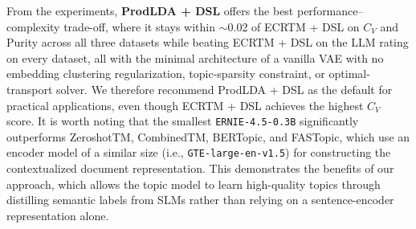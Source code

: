 \documentclass{article}
\theoremstyle{plain}
\theoremstyle{definition}
\theoremstyle{remark}
\begin{document}
From the experiments, \textbf{ProdLDA + DSL} offers the best
performance--complexity trade-off, where it stays within $\sim$0.02 of
ECRTM + DSL on $C_V$ and Purity across all three datasets while
beating ECRTM + DSL on the LLM rating on every dataset, all with the
minimal architecture of a vanilla VAE with no embedding clustering
regularization, topic-sparsity constraint, or optimal-transport solver. We therefore recommend ProdLDA + DSL as the default for practical applications, even though ECRTM + DSL achieves the highest $C_V$ score. It is worth noting that the smallest \texttt{ERNIE-4.5-0.3B} significantly outperforms
ZeroshotTM, CombinedTM, BERTopic, and FASTopic, which use an encoder
model of a similar size (i.e., \texttt{GTE-large-en-v1.5}) for
constructing the contextualized document representation. This
demonstrates the benefits of our approach, which allows the
topic model to learn high-quality topics through distilling semantic labels from SLMs rather than relying on a sentence-encoder representation alone.





\end{document}
